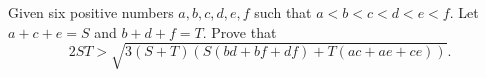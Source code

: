 Given six positive numbers $a,b,c,d,e,f$ such that $a < b < c < d < e < f.$ Let $a+c+e=S$ and $b+d+f=T.$ Prove that\[2ST > \sqrt{3(S+T)\left(S(bd + bf + df) + T(ac + ae + ce) \right)}.\]